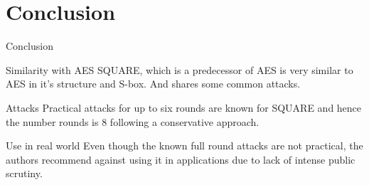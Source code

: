 \section{Conclusion}

\begin{frame}{Conclusion}
  \begin{beamerboxesrounded}{Similarity with AES}
    SQUARE, which is a predecessor of AES is very similar to AES in it's structure and S-box. And shares some common attacks.
  \end{beamerboxesrounded}
  \vspace{5mm}
  \begin{beamerboxesrounded}{Attacks}
    Practical attacks for up to six rounds are known for SQUARE  and hence the number rounds is 8 following a conservative approach.
  \end{beamerboxesrounded}
  \vspace{5mm}
  \begin{beamerboxesrounded}{Use in real world}
    Even though the known full round attacks are not practical, the authors recommend against using it in applications due to lack of intense public scrutiny.
  \end{beamerboxesrounded}
\end{frame}

